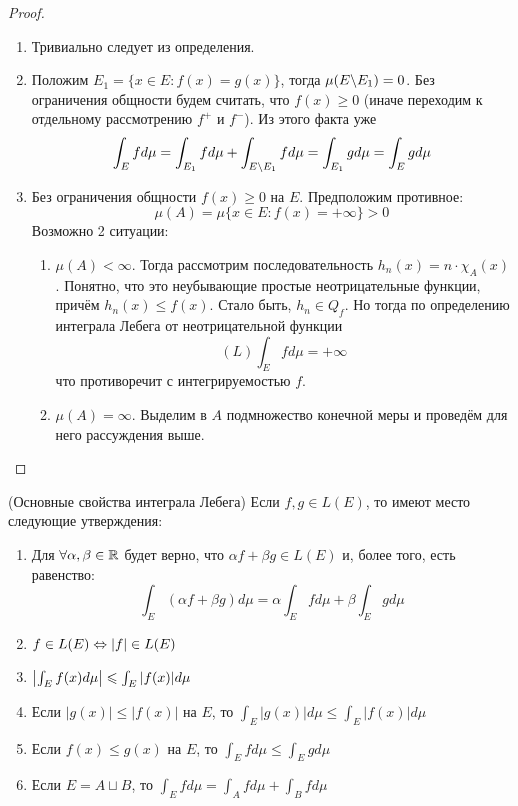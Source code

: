 \begin{proof}~
	\begin{enumerate}
		\item Тривиально следует из определения.
		
		\item Положим $E_1 = \{x \in E \colon f(x) = g(x)\}$, тогда $\mu(E \backslash E_1) = 0$. Без ограничения общности будем считать, что $f(x) \ge 0$ (иначе переходим к отдельному рассмотрению $f^+$ и $f^-$). Из этого факта уже
		\[
			\int_E fd\mu = \int_{E_1} fd\mu + \int_{E \backslash E_1} fd\mu = \int_{E_1} gd\mu = \int_E gd\mu
		\]
		
		\item Без ограничения общности $f(x) \ge 0$ на $E$. Предположим противное:
		\[
			\mu(A) = \mu\{x \in E \colon f(x) = +\infty\} > 0
		\]
		Возможно 2 ситуации:
		\begin{enumerate}
			\item $\mu(A) < \infty$. Тогда рассмотрим последовательность $h_n(x) = n \cdot \chi_A(x)$. Понятно, что это неубывающие простые неотрицательные функции, причём $h_n(x) \le f(x)$. Стало быть, $h_n \in Q_f$. Но тогда по определению интеграла Лебега от неотрицательной функции
			\[
				(L)\int_E fd\mu = +\infty
			\]
			что противоречит с интегрируемостью $f$.
			
			\item $\mu(A) = \infty$. Выделим в $A$ подмножество конечной меры и проведём для него рассуждения выше.
		\end{enumerate}
	\end{enumerate}
\end{proof}

\begin{theorem} (Основные свойства интеграла Лебега)
	Если $f, g \in L(E)$, то имеют место следующие утверждения:
	\begin{enumerate}
		\item Для $\forall \alpha, \beta \in \mathbb{R}$ будет верно, что $\alpha f + \beta g \in L(E)$ и, более того, есть равенство:
		\[
			\int_E (\alpha f + \beta g)d\mu = \alpha \int_E fd\mu + \beta \int_E gd\mu
		\]
		
		\item $f \in L(E) \Leftrightarrow |f| \in L(E)$
		
		\item \(\left|\int_E f(x)d\mu\right| \leqslant \int_E |f(x)|d\mu\)
		
		\item Если $|g(x)| \le |f(x)|$ на $E$, то \(\int_E |g(x)|d\mu \le \int_E |f(x)|d\mu\)
		
		\item Если $f(x) \le g(x)$ на $E$, то \(\int_E fd\mu \le \int_E gd\mu\)
		
		\item Если $E = A \sqcup B$, то $\int_E fd\mu = \int_A fd\mu + \int_B fd\mu$
	\end{enumerate}
\end{theorem}

